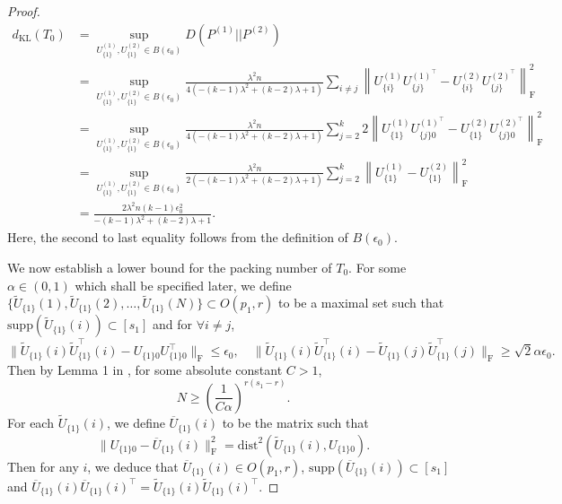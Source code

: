 \documentclass[11pt]{article}
\newcommand{\tilU}{\widetilde{U}}
\newcommand{\barU}{\overline{U}}
\newcommand{\supp}{\mathrm{supp}}
\newcommand{\kl}{\mathrm{KL}}
\newcommand{\dc}[1]{\{#1\}} %
\newcommand{\dist}{\mathrm{dist}}
\newcommand{\0}{{\mathbf{0}}}
\begin{document}
\begin{proof}
\begin{align*}
    d_\kl(T_0) &= \sup_{U^{(1)}_{\dc{1}},U^{(2)}_{\dc{1}}\in B(\epsilon_0)} D(P^{(1)}||P^{(2)})\\
    &= \sup_{U^{(1)}_{\dc{1}},U^{(2)}_{\dc{1}}\in B(\epsilon_0)}\frac{\lambda^2 n}{4\left(-(k-1)\lambda^2+(k-2)\lambda+1\right)}\sum_{i\neq j}\left\|U_{\dc{i}}^{(1)}U_{\dc{j}}^{{(1)}^\top}-U_{\dc{i}}^{(2)}U_{\dc{j}}^{{(2)}^\top}\right\|_\mathrm{F}^2\\
    &= \sup_{U^{(1)}_{\dc{1}},U^{(2)}_{\dc{1}}\in B(\epsilon_0)} \frac{\lambda^2 n}{4\left(-(k-1)\lambda^2+(k-2)\lambda+1\right)} \sum_{j=2}^k 2 \left\|U_{\dc{1}}^{(1)}U_{\dc{j}0}^{{(1)}^\top}-U_{\dc{1}}^{(2)}U_{\dc{j}0}^{{(2)}^\top} \right\|_\mathrm{F}^2\\
    &= \sup_{U^{(1)}_{\dc{1}},U^{(2)}_{\dc{1}}\in B(\epsilon_0)} \frac{\lambda^2 n}{2\left(-(k-1)\lambda^2+(k-2)\lambda+1\right)} \sum_{j=2}^k  \left\|U_{\dc{1}}^{(1)}-U_{\dc{1}}^{(2)} \right\|_\mathrm{F}^2\\
    &= \frac{2\lambda^2 n(k-1)\epsilon_0^2}{-(k-1)\lambda^2+(k-2)\lambda+1}.
\end{align*}
Here, the second to last equality follows from the definition of $B(\epsilon_0)$.
\par We now establish a lower bound for the packing number of $T_0$. For some $\alpha\in(0, 1)$ which shall be specified later, we define $\{\tilU_{\dc{1}}(1), \tilU_{\dc{1}}(2), \dots, \tilU_{\dc{1}}(N)\} \subset O(p_1,r)$ to be a maximal set such that $\supp(\tilU_{\dc{1}}(i))\subset[s_1]$ and for $\forall i\neq j$,\begin{equation*}
    \|\tilU_{\dc{1}}(i)\tilU_{\dc{1}}^\top(i) - U_{\dc{1}0}U_{\dc{1}0}^\top\|_\mathrm{F}\leq \epsilon_0, \quad  \|\tilU_{\dc{1}}(i)\tilU_{\dc{1}}^\top(i) - \tilU_{\dc{1}}(j)\tilU_{\dc{1}}^\top(j)\|_\mathrm{F}\geq \sqrt{2}\alpha\epsilon_0.
\end{equation*}
Then by Lemma 1 in \cite{cai2013sparse}, for some absolute constant $C>1$,\begin{equation*}
    N\geq \left(\frac{1}{C\alpha}\right)^{r(s_1-r)}.
\end{equation*} 
For each $\tilU_{\dc{1}}(i)$, we define $\barU_{\dc{1}}(i)$ to be the matrix such that \begin{equation*}
    \|U_{\dc{1}0} - \barU_{\dc{1}}(i)\|_\mathrm{F}^2 =  \dist^2\left(\tilU_{\dc{1}}(i), U_{\dc{1}0}\right).
\end{equation*}
Then for any $i$, we deduce that $\barU_{\dc{1}}(i)\in O(p_1,r)$, $\supp(\barU_{\dc{1}}(i))\subset [s_1]$ and $\barU_{\dc{1}}(i)\barU_{\dc{1}}(i)^\top =\tilU_{\dc{1}}(i)\tilU_{\dc{1}}(i)^\top $.

\end{proof}
\end{document}
